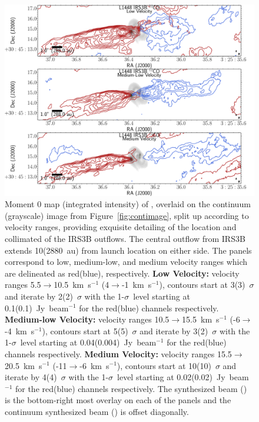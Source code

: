 \begin{figure}[H]
   \begin{center}
   \includegraphics[width=\textwidth]{img/L1448IRS3B_12CO_image_binned_clean__binnedMoments_panel1.pdf}
   \caption{Moment 0 map (integrated intensity) of \co, overlaid on the continuum (grayscale) image from Figure~\ref{fig:contimage}, split up according to velocity ranges, providing exquisite detailing of the location and collimated of the IRS3B outflows. The central outflow from IRS3B extends 10\arcsec\space(2880~au) from launch location on either side. The panels correspond to low, medium-low, and medium velocity ranges which are delineated as red(blue), respectively. \textbf{Low Velocity:} velocity ranges 5.5$\rightarrow$10.5~km~s$^{-1}$ (4$\rightarrow$-1~km~s$^{-1}$), contours start at 3(3)~$\sigma$ and iterate by 2(2)~$\sigma$ with the 1-$\sigma$~level starting at 0.1(0.1)~Jy~beam$^{-1}$ for the red(blue) channels respectively. \textbf{Medium-low Velocity:} velocity ranges 10.5$\rightarrow$15.5~km~s$^{-1}$ (-6$\rightarrow$-4~km~s$^{-1}$), contours start at 5(5)~$\sigma$ and iterate by 3(2)~$\sigma$ with the 1-$\sigma$~level starting at 0.04(0.004)~Jy~beam$^{-1}$ for the red(blue) channels respectively. \textbf{Medium Velocity:} velocity ranges 15.5$\rightarrow$20.5~km~s$^{-1}$ (-11$\rightarrow$-6~km~s$^{-1}$), contours start at 10(10)~$\sigma$ and iterate by 4(4)~$\sigma$ with the 1-$\sigma$~level starting at 0.02(0.02)~Jy~beam$^{-1}$ for the red(blue) channels respectively. The \co\space synthesized beam (\cobeam) is the bottom-right most overlay on each of the panels and the continuum synthesized beam (\contbeam) is offset diagonally.}\label{fig:comomentmap}
\end{center}
\end{figure}
